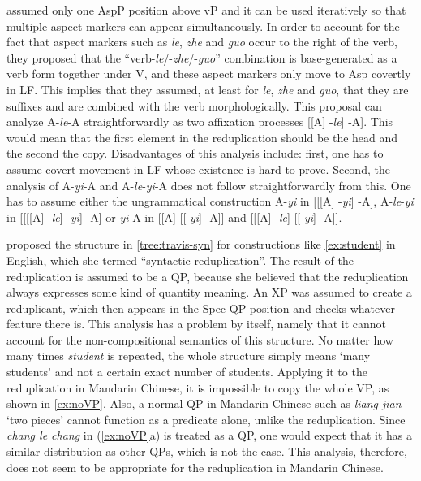 \documentclass[
a4paper,
10pt,
oneside,
]{scrartcl}
\begin{document}
\citet{Huangetal2009} assumed only one AspP position above vP and it can be used iteratively so that
multiple aspect markers can appear simultaneously. In order to account for the fact that aspect
markers such as \emph{le}, \emph{zhe} and \emph{guo} occur to the right of the verb, they proposed
that the ``verb-\emph{le}/-\emph{zhe}/-\emph{guo}'' combination is base-generated as a verb form
together under V, and these aspect markers only move to Asp covertly in LF. This implies that they
assumed, at least for \emph{le}, \emph{zhe} and \emph{guo},  that they are suffixes and are combined
with the verb morphologically. This proposal can analyze A-\emph{le}-A straightforwardly as two
affixation processes [[A] -\emph{le}] -A]. This would mean that the first element in the
reduplication should be the head and the second the copy.  Disadvantages of this analysis include:
first, one has to assume covert movement in LF whose existence is hard to prove. Second, the
analysis of A-\emph{yi}-A and A-\emph{le}-\emph{yi}-A does not follow straightforwardly from
this. One has to assume either the ungrammatical construction A-\emph{yi} in [[[A] -\emph{yi}] -A],
A-\emph{le}-\emph{yi} in [[[[A] -\emph{le}] -\emph{yi}] -A] or \emph{yi}-A in [[A] [[-\emph{yi}]
-A]] and [[[A] -\emph{le}] [[-\emph{yi}] -A]]. 


\citet{Travis2001-short, Travis2003} proposed the structure in \ref{tree:travis-syn} for
constructions like \ref{ex:student} in English, which she termed ``syntactic reduplication''. The
result of the reduplication is assumed to be a QP, because she believed that the reduplication
always expresses some kind of quantity meaning. An XP was assumed to create a reduplicant, which
then appears in the Spec-QP position and checks whatever feature there is. This analysis has a
problem by itself, namely that it cannot account for the non-compositional semantics of this
structure. No matter how many times \emph{student} is repeated, the whole structure simply means
`many students' and not a certain exact number of students. Applying it to the reduplication in
Mandarin Chinese, it is impossible to copy the whole VP, as shown in \ref{ex:noVP}. Also, a normal
QP in Mandarin Chinese such as \emph{liang jian} `two pieces' cannot function as a predicate alone,
unlike the reduplication. Since \emph{chang le chang} in (\ref{ex:noVP}a) is treated as a QP, one
would expect that it has a similar distribution as other QPs, which is not the case. This analysis,
therefore, does not seem to be appropriate for the reduplication in Mandarin Chinese. 
\end{document}
